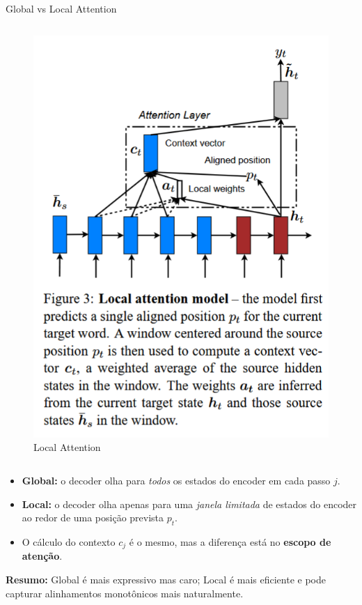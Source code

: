 \documentclass{beamer}
\begin{document}
\begin{frame}{Global vs Local Attention \cite{luong2015effective}}
\begin{columns}[c]
\begin{figure}
      \includegraphics[width=\linewidth]{assets/local attention.png}
      \caption*{Local Attention}
    \end{figure}
\end{columns}

\begin{itemize}
  \item \textbf{Global:} o decoder olha para \emph{todos} os estados do encoder em cada passo $j$.  
  \item \textbf{Local:} o decoder olha apenas para uma \emph{janela limitada} de estados do encoder ao redor de uma posição prevista $p_t$.  
  \item O cálculo do contexto $c_j$ é o mesmo, mas a diferença está no \textbf{escopo de atenção}.  
\end{itemize}

\textbf{Resumo:}  
Global é mais expressivo mas caro; Local é mais eficiente e pode capturar alinhamentos monotônicos mais naturalmente.
\end{frame}
\end{document}
